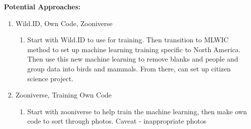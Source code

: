 \documentclass[11pt,a4paper]{article}\usepackage[]{graphicx}\usepackage[]{color}
\begin{document}
\noindent \textbf{Potential Approaches:}
\begin{enumerate}
\item Wild.ID, Own Code, Zooniverse
  \begin{enumerate}
  \item Start with Wild.ID to use for training. Then transition to MLWIC method to set up machine learning training specific to North America. Then use this new machine learning to remove blanks and people and group data into birds and mammals. From there, can set up citizen science project.
  \end{enumerate}
\item Zooniverse, Training Own Code
  \begin{enumerate}
  \item Start with zooniverse to help train the machine learning, then make own code to sort through photos. Caveat - inappropriate photos
  \end{enumerate}
\end{enumerate}
\end{document}
